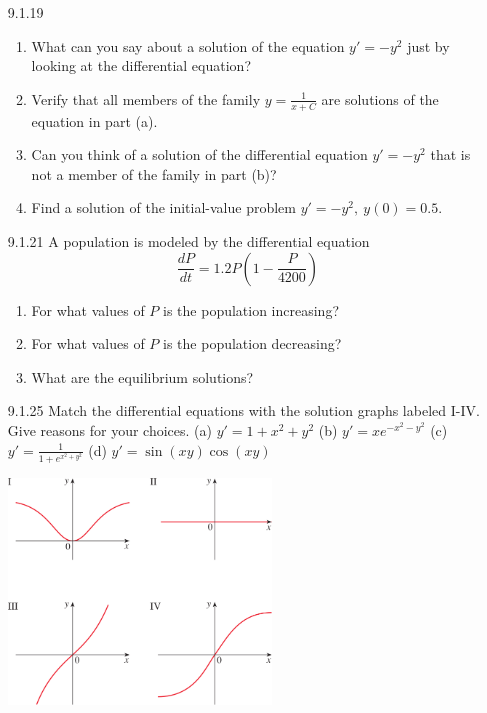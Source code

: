 \documentclass{article}
\begin{document}
\begin{enumerate}
\item[9.1.19]
    \begin{enumerate}
        \item What can you say about a solution of the equation $y'=-y^{2}$ just
            by looking at the differential equation?
        \item Verify that all members of the family $y=\frac{1}{x+C}$
            are solutions of the equation in part (a).
        \item Can you think of a solution of the differential equation $y'=-y^{2}$
            that is not a member of the family in part (b)?
        \item Find a solution of the initial-value problem
            $y' = -y^{2},\ y(0) = 0.5$.
    \end{enumerate}

\vspace{5cm}

\item[9.1.21]
    A population is modeled by the differential equation
    \[
        \frac{dP}{dt} = 1.2P \left( 1 - \frac{P}{4200} \right)
    \]
    \begin{enumerate}
        \item For what values of $P$ is the population increasing?
        \item For what values of $P$ is the population decreasing?
        \item What are the equilibrium solutions?
    \end{enumerate}

\newpage

\item[9.1.25]
    Match the differential equations with the solution graphs labeled I-IV.
    Give reasons for your choices.
    (a) $y'=1+x^{2}+y^{2}$
    \hspace{0.5cm}
    (b) $y'=xe^{-x^{2}-y^{2}}$
    \hspace{0.5cm}
    (c) $y'=\frac{1}{1+e^{x^{2}+y^{2}}}$
    \hspace{0.5cm}
    (d) $y'= \sin (xy) \cos (xy)  $

    \begin{center}
        \includegraphics[height=6cm]{./png/9.1.25.png}
    \end{center}


\end{enumerate}
\end{document}
